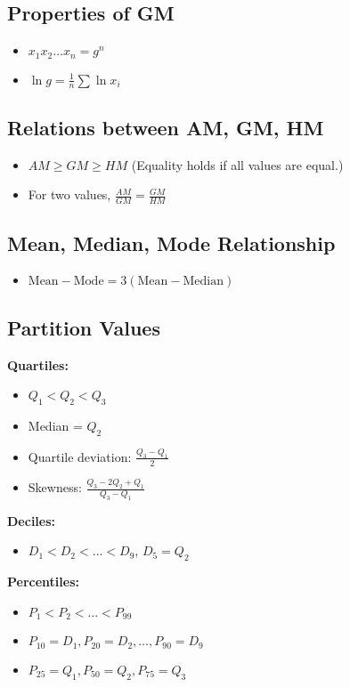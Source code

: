 \subsection*{Properties of GM}
\begin{itemize}
    \item $ x_1 x_2 \dots x_n = g^n $
    \item $ \ln g = \frac{1}{n} \sum \ln x_i $
\end{itemize}

\subsection*{Relations between AM, GM, HM}
\begin{itemize}
    \item $ AM \geq GM \geq HM $ (Equality holds if all values are equal.)
    \item For two values, $ \frac{AM}{GM} = \frac{GM}{HM} $
\end{itemize}

\subsection*{Mean, Median, Mode Relationship}
\begin{itemize}
    \item $ \text{Mean} - \text{Mode} = 3(\text{Mean} - \text{Median}) $
\end{itemize}

\subsection*{Partition Values}
\textbf{Quartiles:}
\begin{itemize}
    \item $ Q_1 < Q_2 < Q_3 $
    \item Median = $ Q_2 $
    \item Quartile deviation: $ \frac{Q_3 - Q_1}{2} $
    \item Skewness: $ \frac{Q_3 - 2Q_2 + Q_1}{Q_3 - Q_1} $
\end{itemize}

\textbf{Deciles:}
\begin{itemize}
    \item $ D_1 < D_2 < \dots < D_9 $, $ D_5 = Q_2 $
\end{itemize}

\textbf{Percentiles:}
\begin{itemize}
    \item $ P_1 < P_2 < \dots < P_{99} $
    \item $ P_{10} = D_1, P_{20} = D_2, \dots, P_{90} = D_9 $
    \item $ P_{25} = Q_1, P_{50} = Q_2, P_{75} = Q_3 $
\end{itemize}


